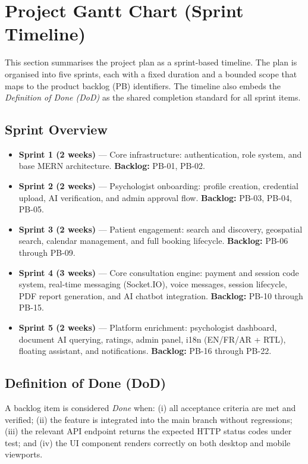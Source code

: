 
\section{Project Gantt Chart (Sprint Timeline)}
\label{sec:gantt-sprints}

This section summarises the project plan as a sprint-based timeline. The plan is
organised into five sprints, each with a fixed duration and a bounded scope that
maps to the product backlog (PB) identifiers. The timeline also embeds the
\emph{Definition of Done (DoD)} as the shared completion standard for all sprint
items.

\subsection{Sprint Overview}
\begin{itemize}
  \item \textbf{Sprint 1 (2 weeks)} — Core infrastructure: authentication, role
  system, and base MERN architecture. \textbf{Backlog:} PB-01, PB-02.
  \item \textbf{Sprint 2 (2 weeks)} — Psychologist onboarding: profile creation,
  credential upload, AI verification, and admin approval flow.
  \textbf{Backlog:} PB-03, PB-04, PB-05.
  \item \textbf{Sprint 3 (2 weeks)} — Patient engagement: search and discovery,
  geospatial search, calendar management, and full booking lifecycle.
  \textbf{Backlog:} PB-06 through PB-09.
  \item \textbf{Sprint 4 (3 weeks)} — Core consultation engine: payment and
  session code system, real-time messaging (Socket.IO), voice messages, session
  lifecycle, PDF report generation, and AI chatbot integration.
  \textbf{Backlog:} PB-10 through PB-15.
  \item \textbf{Sprint 5 (2 weeks)} — Platform enrichment: psychologist
  dashboard, document AI querying, ratings, admin panel, i18n (EN/FR/AR + RTL),
  floating assistant, and notifications. \textbf{Backlog:} PB-16 through PB-22.
\end{itemize}

\subsection{Definition of Done (DoD)}
A backlog item is considered \emph{Done} when: (i) all acceptance criteria are
met and verified; (ii) the feature is integrated into the main branch without
regressions; (iii) the relevant API endpoint returns the expected HTTP status
codes under test; and (iv) the UI component renders correctly on both desktop
and mobile viewports.

